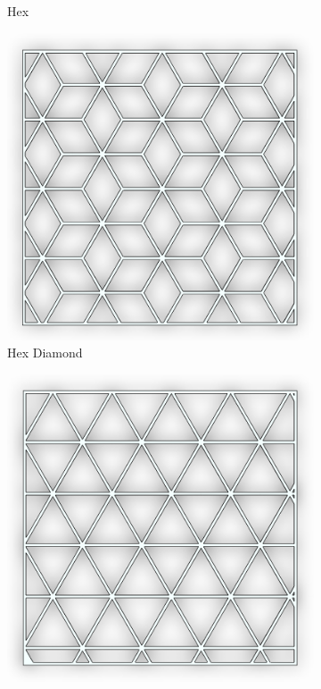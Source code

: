 \documentclass[12pt, letterpaper]{article}
\begin{document}
\begin{figure}[H]
\begin{subfigure}[b]{.3\linewidth}
		\caption{Hex}
	\end{subfigure}
	\begin{subfigure}[b]{.3\linewidth}
		\includegraphics[width=\linewidth]{hex-diamond}
		\caption{Hex Diamond}
	\end{subfigure}
	\begin{subfigure}[b]{.3\linewidth}
		\includegraphics[width=\linewidth]{triangle}

\end{subfigure}
\end{figure}
\end{document}
